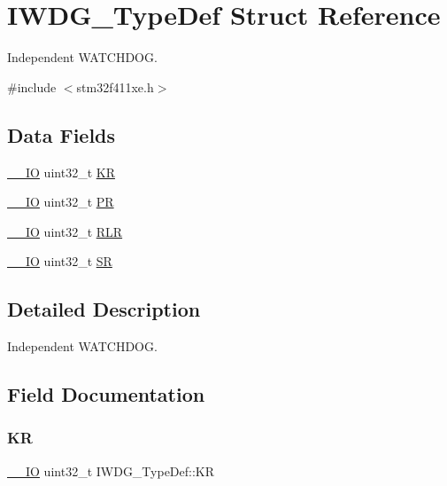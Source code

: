 \hypertarget{struct_i_w_d_g___type_def}{}\section{I\+W\+D\+G\+\_\+\+Type\+Def Struct Reference}
\label{struct_i_w_d_g___type_def}


Independent W\+A\+T\+C\+H\+D\+OG.  




{\ttfamily \#include $<$stm32f411xe.\+h$>$}

\subsection*{Data Fields}
\begin{DoxyCompactItemize}
\item 
\hyperlink{core__sc300_8h_aec43007d9998a0a0e01faede4133d6be}{\+\_\+\+\_\+\+IO} uint32\+\_\+t \hyperlink{struct_i_w_d_g___type_def_a63089aaa5f4ad34ee2677ebcdee49cd9}{KR}
\item 
\hyperlink{core__sc300_8h_aec43007d9998a0a0e01faede4133d6be}{\+\_\+\+\_\+\+IO} uint32\+\_\+t \hyperlink{struct_i_w_d_g___type_def_a5f2717885ff171e686e0347af9e6b68d}{PR}
\item 
\hyperlink{core__sc300_8h_aec43007d9998a0a0e01faede4133d6be}{\+\_\+\+\_\+\+IO} uint32\+\_\+t \hyperlink{struct_i_w_d_g___type_def_aa3703eaa40e447dcacc69c0827595532}{R\+LR}
\item 
\hyperlink{core__sc300_8h_aec43007d9998a0a0e01faede4133d6be}{\+\_\+\+\_\+\+IO} uint32\+\_\+t \hyperlink{struct_i_w_d_g___type_def_a9bbfbe921f2acfaf58251849bd0a511c}{SR}
\end{DoxyCompactItemize}


\subsection{Detailed Description}
Independent W\+A\+T\+C\+H\+D\+OG. 

\subsection{Field Documentation}
\mbox{\label{struct_i_w_d_g___type_def_a63089aaa5f4ad34ee2677ebcdee49cd9}} 
\subsubsection{\texorpdfstring{KR}{KR}}
{\footnotesize\ttfamily \hyperlink{core__sc300_8h_aec43007d9998a0a0e01faede4133d6be}{\+\_\+\+\_\+\+IO} uint32\+\_\+t I\+W\+D\+G\+\_\+\+Type\+Def\+::\+KR}

